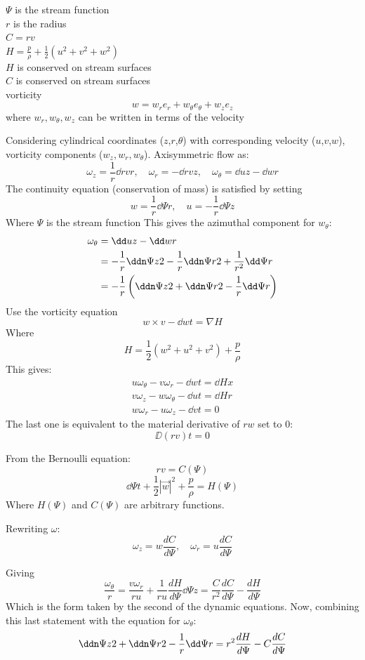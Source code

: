 \documentclass{X:/Documents/Coding/Latex/myreport}
\begin{document}
$\Psi$ is the stream function\\
$r$ is the radius\\
$C = rv$\\
$H = \frac{p}{\rho} + \frac12 (u^2 + v^2 + w^2)$ \\
$H$ is conserved on stream surfaces \\
$C$ is conserved on stream surfaces \\

vorticity
\[w = w_re_r + w_\theta e_\theta + w_ze_z\]
where $w_r, w_\theta, w_z$ can be written in terms of the velocity

\newpage

Considering cylindrical coordinates ($z$,$r$,$\theta$) with corresponding velocity ($u$,$v$,$w$), vorticity components ($w_z,w_r,w_\theta$). Axisymmetric flow as:
\[\omega_z = \frac1r \dd{rv}{r}, \quad \omega_r = -\dd{rv}{z},\quad \omega_\theta = \dd{u}{z} - \dd{w}{r}\]
The continuity equation (conservation of mass) is satisfied by setting
\[w =\frac1r \dd\Psi{r} , \quad u=-\frac1r \dd\Psi{z}\]
Where $\Psi$ is the stream function
This gives the azimuthal component for $w_\theta$:
\begin{align*}
    \omega_\theta &= \dd uz - \dd wr\\
    &= -\frac1r \ddn\Psi z2 - \frac1r \ddn \Psi r2 + \frac{1}{r^2} \dd\Psi r\\
    &= -\frac1r\left(\ddn\Psi z2 + \ddn \Psi r2 - \frac1r\dd\Psi r\right)
\end{align*}
Use the vorticity equation
\[w \times v - \dd wt = \nabla H\]
Where 
\[H = \frac12 (w^2 + u^2 + v^2) + \frac p\rho \]
This gives:
\begin{align*}
    u\omega_\theta - v\omega_r - \dd wt = \dd Hx\\
    v \omega_z - w \omega_\theta - \dd ut = \dd Hr\\
    w\omega_r - u \omega_z - \dd vt = 0
\end{align*}
The last one is equivalent to the material derivative of $rw$ set to 0:
\[\DD{(rv)}{t} = 0\]

From the Bernoulli equation:
\[rv = C(\Psi)\]
\[\dd{\Psi}{t} + \frac12 |\vec w|^2 + \frac{p}{\rho} = H(\Psi)\]
Where $H(\Psi)$ and $C(\Psi)$ are arbitrary functions.

Rewriting $\omega$:
\[\omega_z = w \frac{dC}{d\Psi}, \quad \omega_r = u \frac{dC}{d\Psi}\]
 

Giving
\[\frac{\omega_\theta}{r} = \frac{v\omega_r}{ru} + \frac1{ru}\frac{dH}{d\Psi} \dd\Psi z = \frac{C}{r^2} \frac{dC}{d\Psi} - \frac{dH}{d\Psi}\]
Which is the form taken by the second of the dynamic equations.
Now, combining this last statement with the equation for $\omega_\theta$:
\[\ddn \Psi z 2 + \ddn \Psi r2 - \frac1r \dd\Psi r= r^2 \frac{dH}{d\Psi} - C\frac{dC}{d\Psi}\]
\end{document}
